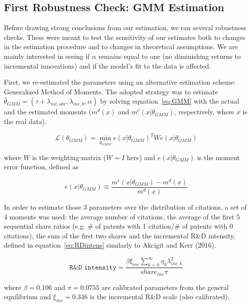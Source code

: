 \documentclass[letterpaper,12pt]{article}
\theoremstyle{definition}
\begin{document}
\subsection{First Robustness Check: GMM Estimation}

Before drawing strong conclusions from our estimation, we ran several robustness checks. These were meant to test the sensitivity of our estimates both to changes in the estimation procedure and to changes in theoretical assumptions.  We are mainly interested in seeing if $\alpha$ remains equal to one (no diminishing returns to incremental innovations) and if the model's fit to the data is affected.

First, we re-estimated the parameters using an alternative estimation scheme: Generalized Method of Moments. The adopted strategy was to estimate $\hat{\theta}_{GMM} = (\tau + \lambda_{int,abr}, \lambda_{inc,0}, \alpha)$ by solving equation~\eqref{eq:GMM} with the actual and the estimated moments ($m^d(x)$ and $m^e(x|\theta_{GMM})$, respectively, where $x$ is the real data).

\begin{equation} \label{eq:GMM}
\mathscr{L}(\theta_{GMM}) =  \min\limits_{\theta_{GMM}}e(x|\theta_{GMM})^TWe(x|\theta_{GMM})
\end{equation}

\noindent where $W$ is the weighting-matrix ($W = I$ here) and $e(x|\theta_{GMM})$ is the moment error function, defined as

\begin{equation} \label{eq:GMM_error}
e(x|\theta_{GMM}) \equiv \frac{m^e(x|\theta_{GMM}) - m^d(x)}{m^d(x)}
\end{equation}

In order to estimate those 3 parameters over the distribution of citations, a set of 4 moments was used: the average number of citations, the average of the first 5 sequential share ratios (e.g. \# of patents with 1 citation/\# of patents with 0 citations), the sum of the first two shares and the incremental R\&D intensity, defined in equation~\eqref{eq:RDintens} similarly to Akcigit and Kerr (2016).

\begin{equation} \label{eq:RDintens}
\texttt{R\&D intensity} = \frac{\beta\xi_{inc}\displaystyle\sum_{k=0}^{\infty}\eta_k\lambda_{inc,k}^2}{share_{inc}\pi}
\end{equation}

\noindent where $\beta = 0.106$ and $\pi = 0.0755$ are calibrated parameters from the general equilibrium and $\xi_{inc} = 0.346$ is the incremental R\&D scale (also calibrated).
\end{document}
